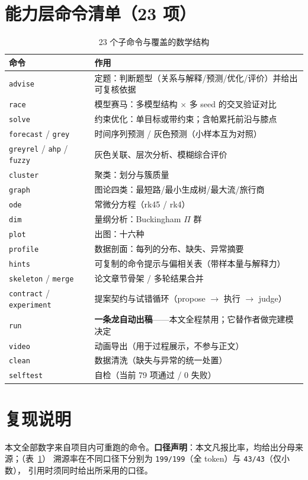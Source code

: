 \documentclass[11pt,a4paper]{article}
\newcommand{\code}[1]{\texttt{#1}}
\begin{document}
\section{能力层命令清单（23 项）}
\begin{table}[tbp]\centering\footnotesize
\caption{23 个子命令与覆盖的数学结构}\label{tab:cmds}
\setlength{\tabcolsep}{3pt}
\begin{tabular}{p{2.2cm}p{11.6cm}}
\toprule
命令 & 作用\\
\midrule
\code{advise} & 定题：判断题型（关系与解释/预测/优化/评价）并给出可复核依据\\
\code{race} & 模型赛马：多模型结构 $\times$ 多 seed 的交叉验证对比\\
\code{solve} & 约束优化：单目标或带约束；含帕累托前沿与膝点\\
\code{forecast} / \code{grey} & 时间序列预测 / 灰色预测（小样本互为对照）\\
\code{greyrel} / \code{ahp} / \code{fuzzy} & 灰色关联、层次分析、模糊综合评价\\
\code{cluster} & 聚类：划分与簇质量\\
\code{graph} & 图论四类：最短路/最小生成树/最大流/旅行商\\
\code{ode} & 常微分方程（rk45 / rk4）\\
\code{dim} & 量纲分析：Buckingham $\Pi$ 群\\
\code{plot} & 出图：十六种\\
\code{profile} & 数据剖面：每列的分布、缺失、异常摘要\\
\code{hints} & 可复制的命令提示与偏相关表（带样本量与解释力）\\
\code{skeleton} / \code{merge} & 论文章节骨架 / 多轮结果合并\\
\code{contract} / \code{experiment} & 提案契约与试错循环（propose $\to$ 执行 $\to$ judge）\\
\code{run} & \textbf{一条龙自动出稿}——本文全程禁用；它替作者做完建模决定\\
\code{video} & 动画导出（用于过程展示，不参与正文）\\
\code{clean} & 数据清洗（缺失与异常的统一处置）\\
\code{selftest} & 自检（当前 79 项通过 / 0 失败）\\
\bottomrule
\end{tabular}
\end{table}

\section{复现说明}
本文全部数字来自项目内可重跑的命令。\textbf{口径声明}：本文凡报比率，均给出分母来源；（表~\ref{tab:cmds}）
溯源率在不同口径下分别为 \code{199/199}（全 token）与 \code{43/43}（仅小数），
引用时须同时给出所采用的口径。
\end{document}

